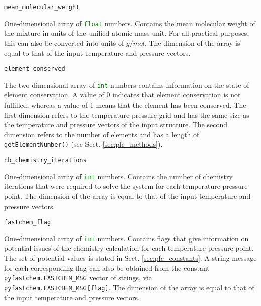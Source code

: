 \documentclass[numbers=noenddot]{aux/fcmanual}
\begin{document}
\bigbreak

\lstinline!mean_molecular_weight!
\begin{addmargin}[25pt]{0pt}
	One-dimensional array of \lstinline[language=Python]!float! numbers. Contains the mean molecular weight of the mixture in units of the unified atomic mass unit. For all practical purposes, this can also be converted into units of $\unit{g/mol}$. The dimension of the array is equal to that of the input temperature and pressure vectors.
\end{addmargin}

\bigbreak

\lstinline!element_conserved!
\begin{addmargin}[25pt]{0pt}
	The two-dimensional array of \lstinline[language=Python]!int! numbers contains information on the state of element conservation. A value of 0 indicates that element conservation is not fulfilled, whereas a value of 1 means that the element has been conserved. The first dimension refers to the temperature-pressure grid and has the same size as the temperature and pressure vectors of the input structure. The second dimension refers to the number of elements and has a length of \lstinline!getElementNumber()! (see Sect. \ref{sec:pfc_methods}).
\end{addmargin}

\bigbreak

\lstinline!nb_chemistry_iterations!
\begin{addmargin}[25pt]{0pt}
	One-dimensional array of \lstinline[language=Python]!int! numbers. Contains the number of chemistry iterations that were required to solve the system for each temperature-pressure point. The dimension of the array is equal to that of the input temperature and pressure vectors.
\end{addmargin}

\bigbreak

\lstinline!fastchem_flag!
\begin{addmargin}[25pt]{0pt}
	One-dimensional array of \lstinline[language=Python]!int! numbers. Contains flags that give information on potential issues of the chemistry calculation for each temperature-pressure point. The set of potential values is stated in Sect. \ref{sec:pfc_constants}. A string message for each corresponding flag can also be obtained from the constant \lstinline!pyfastchem.FASTCHEM_MSG! vector of strings, via \lstinline!pyfastchem.FASTCHEM_MSG[flag]!. The dimension of the array is equal to that of the input temperature and pressure vectors.
\end{addmargin}
\end{document}
